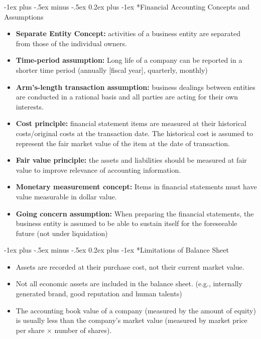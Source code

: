 \documentclass[10pt,landscape]{article}
\makeatletter
\renewcommand{\subsubsection}{\@startsection{subsubsection}{3}{0mm}%
                                {-1ex plus -.5ex minus -.5ex}%
                                {0.2ex plus -1ex}%
                                {\normalfont\footnotesize\bfseries}}
\makeatother
\begin{document}
\begin{multicols}{3}
\begin{scriptsize}
\subsubsection*{Financial Accounting Concepts and Assumptions}
\begin{itemize} \itemsep -2pt
    \item \textbf{Separate Entity Concept:} activities of a business entity are separated from those of the individual owners.
    \item \textbf{Time-period assumption:} Long life of a company can be reported in a shorter time period (annually [fiscal year], quarterly, monthly)
    \item \textbf{Arm's-length transaction assumption:} business dealings between entities are conducted in a rational basis and all parties are acting for their own interests.
    \item \textbf{Cost principle:} financial statement items are measured at their historical costs/original costs at the transaction date.
    The historical cost is assumed to represent the fair market value of the item at the date of transaction.
    \item \textbf{Fair value principle:} the assets and liabilities should be 
    measured at fair value to improve relevance of accounting information.
    \item \textbf{Monetary measurement concept:} Items in financial statements must have value measurable in dollar value.
    \item \textbf{Going concern assumption:} When preparing the financial 
    statements, the business entity is assumed to be able to sustain itself for the foreseeable future (not under liquidation)
\end{itemize}

\subsubsection*{Limitations of Balance Sheet}
\begin{itemize} \itemsep -2pt
    \item Assets are recorded at their purchase cost, not their current market value.
    \item Not all economic assets are included in the balance sheet. 
    (e.g., internally generated brand, good reputation and human talents)
    \item The accounting book value of a company (measured by the amount of equity) is usually less 
    than the company’s market value (measured by market price per share $\times$ number of shares).
\end{itemize}


\end{scriptsize}
\end{multicols}
\end{document}
